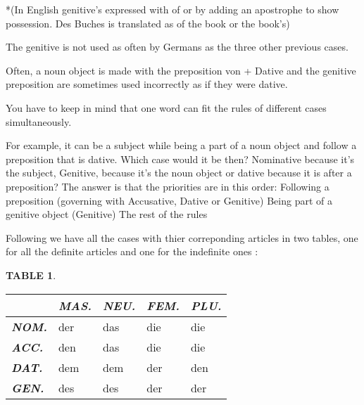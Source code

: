 \documentclass[a4paper,twocolumn,10pt]{article}
\newtheorem{mytable}{TABLE}[section]
\newcommand{\newpar}
{\par \vspace{0.3cm}}
\newcommand{\tcolorboxstart}
{
	\nolinenumbers
	\vspace{0.2cm}
	\centering
}
\newcommand{\tcolorboxend}
{
	\justifying
	\vspace{0.2cm}
	\linenumbers
}
\newcommand{\tcolorboxtable}[5]
{
\tcolorboxstart
\begin{table-bg}#3{}

	\begin{table-title}[width=6.5cm]{}
		\captionsetup{labelformat=empty}
		\captionof{table}{#1}
	\end{table-title}

	\begin{table-theword}
		\footnotesize
		\begin{mytable}
		#2
		\end{mytable}
	\end{table-theword}

	\begin{table-content}
	\begin{tabularx}{\textwidth}{#4}

		#5
		
	\end{tabularx}
	\end{table-content}

\end{table-bg}
\tcolorboxend
}
\begin{document}
*(In English genitive’s expressed with of or by adding an apostrophe to show
possession. Des Buches is translated as of the book or the book’s)

The genitive is not used as often by Germans as the three
other previous cases.


Often, a noun object is made with the preposition von +
Dative and the genitive preposition are sometimes used incorrectly as if they
were dative.


You have to keep in mind that one word can fit the rules of different cases
simultaneously.


For example, it can be a subject while being a
part of a noun object and follow a preposition that is dative. Which case would
it be then?  Nominative because it’s the subject, Genitive, because it’s the
noun object or dative because it is after a preposition?  The answer is that the
priorities are in this order: Following a preposition (governing with
Accusative, Dative or Genitive) Being part of a genitive object (Genitive) The
rest of the rules


Following we have all the cases with thier correponding articles in two tables,
one for all the definite articles and one for the indefinite ones :\newpar




\tcolorboxtable
{ Definite Articles }
{ \label{table:definite_articles} }
{ [width=\linewidth] }
{ l|XXXX }
{

		&
		\cellcolor{table-subtopic} \textbf{\textit{MAS.}}  &
		\cellcolor{table-subtopic} \textbf{\textit{NEU.}}  &
		\cellcolor{table-subtopic} \textbf{\textit{FEM.}}  &
		\cellcolor{table-subtopic} \textbf{\textit{PLU.}} \\

		\midrule

		\cellcolor{table-subtopic} \textbf{\textit{NOM.}} &
		\cellcolor{cell-lightpurple}  der            &
		\cellcolor{cell-lightorange}  das            &
		\cellcolor{cell-lightblue}    die            &
		\cellcolor{cell-lightblue}    die \\

		\cellcolor{table-subtopic} \textbf{\textit{ACC.}} &
		\cellcolor{cell-lightgreen}   den            &
		\cellcolor{cell-lightorange}  das            &
		\cellcolor{cell-lightblue}    die            &
		\cellcolor{cell-lightblue}    die \\

		\cellcolor{table-subtopic} \textbf{\textit{DAT.}} &
		\cellcolor{cell-lightred}    dem             &
		\cellcolor{cell-lightred}    dem             &
		\cellcolor{cell-lightpurple} der             &
		\cellcolor{cell-lightgreen}  den \\

		\cellcolor{table-subtopic} \textbf{\textit{GEN.}} &
		\cellcolor{cell-lightyellow} des               &
		\cellcolor{cell-lightyellow} des               &
		\cellcolor{cell-lightpurple} der               &
		\cellcolor{cell-lightpurple} der \\



}
\end{document}
